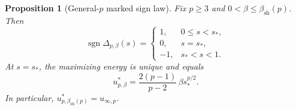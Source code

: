 \documentclass[10pt,a4paper]{amsart}
\newtheorem{proposition}{Proposition}
\begin{document}
\begin{proposition}[General-\(p\) marked sign law]
\label{prop:general-p-marked}
Fix \(p\geq3\) and \(0<\beta\leq\beta_{\mathrm{sh}}(p)\).  Then
\begin{equation}\label{eq:generalSignLaw}
 \operatorname{sgn}\Delta_{p,\beta}(s)
 =\begin{cases}
  1, & 0\leq s<s_*,\\
  0, & s=s_*,\\
  -1, & s_*<s<1.
 \end{cases}
\end{equation}
At \(s=s_*\), the maximizing energy is unique and equals
\begin{equation}\label{eq:generalContactEnergy}
 u^*_{p,\beta}
 =\frac{2(p-1)}{p-2}\,\beta s_*^{p/2}.
\end{equation}
In particular,
\(u^*_{p,\beta_{\mathrm{sh}}(p)}=u_{\infty,p}\).
\end{proposition}
\end{document}
